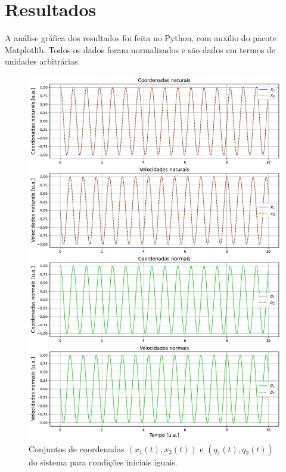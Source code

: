 \documentclass[a4paper, 11pt]{article}
\begin{document}
\newpage
\section{ Resultados }

    A análise gráfica dos resultados foi feita no Python, com auxílio do pacote Matplotlib. Todos os dados foram normalizados e são dados em termos de unidades arbitrárias.
    
    \begin{figure}[h!]
        \centering
        \includegraphics[width=1\linewidth]{graph_coordenadas_iguais.pdf}
        \caption{ Conjuntos de coordenadas $(x_1(t),x_2(t))$ e $(q_1(t),q_2(t))$ do sistema para condições iniciais iguais.
        \label{figura :: coordenadas condições iguais}}
    \end{figure}
\end{document}
